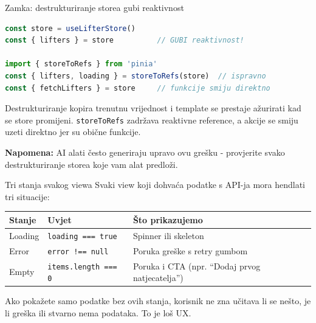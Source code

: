 \begin{frame}[fragile,shrink=5]{Zamka: destrukturiranje storea gubi reaktivnost}
\begin{lstlisting}[language=typescript]
const store = useLifterStore()
const { lifters } = store          // GUBI reaktivnost!

import { storeToRefs } from 'pinia'
const { lifters, loading } = storeToRefs(store)  // ispravno
const { fetchLifters } = store     // funkcije smiju direktno
\end{lstlisting}

\vspace{0.4em}
Destrukturiranje kopira trenutnu vrijednost i template se prestaje ažurirati kad se store promijeni. \texttt{storeToRefs} zadržava reaktivne reference, a akcije se smiju uzeti direktno jer su obične funkcije.

\vspace{0.4em}
\textbf{Napomena:} AI alati često generiraju upravo ovu grešku - provjerite svako destrukturiranje storea koje vam alat predloži.
\end{frame}

\begin{frame}{Tri stanja svakog viewa}
Svaki view koji dohvaća podatke s API-ja mora hendlati tri situacije:

\vspace{0.6em}
\begin{tabular}{@{}llp{6cm}@{}}
  \toprule
  \textbf{Stanje} & \textbf{Uvjet} & \textbf{Što prikazujemo} \\
  \midrule
  Loading & \texttt{loading === true} & Spinner ili skeleton \\
  Error & \texttt{error !== null} & Poruka greške s retry gumbom \\
  Empty & \texttt{items.length === 0} & Poruka i CTA (npr. \enquote{Dodaj prvog natjecatelja}) \\
  \bottomrule
\end{tabular}

\vspace{0.6em}
Ako pokažete samo podatke bez ovih stanja, korisnik ne zna učitava li se nešto, je li greška ili stvarno nema podataka. To je loš UX.
\end{frame}

